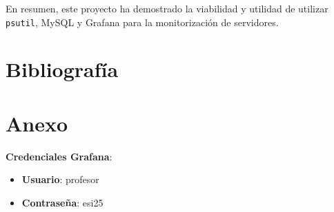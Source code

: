 \documentclass{article}
\begin{document}
En resumen, este proyecto ha demostrado la viabilidad y utilidad de utilizar \texttt{psutil}, MySQL y Grafana para la monitorización de servidores.

\section{Bibliografía}

\printbibliography

\section{Anexo}

\textbf{Credenciales Grafana}:
\begin{itemize}
    \item \textbf{Usuario}: profesor
    \item \textbf{Contraseña}: esi25
\end{itemize}
\end{document}
